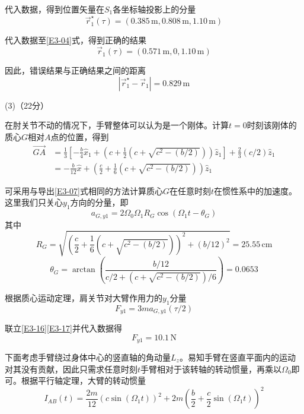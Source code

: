 \documentclass[10pt,a4paper,onecolumn,UTF8]{ctexart}
\begin{document}
	代入数据，得到位置矢量在$S_1$各坐标轴投影上的分量
	\begin{equation}
		\vec r_1^{\star}(\tau)=(0.385\,\text{m},0.808\,\text{m},1.10\,\text{m})
	\end{equation}
	
	代入数据至\eqref{E3-04}式，得到正确的结果
	\begin{equation}
		\vec r_1(\tau)=(0.571\,\text{m},0,1.10\,\text{m})
	\end{equation}
	
	因此，错误结果与正确结果之间的距离
	\begin{equation}
		|\vec r_1^{\star}-\vec r_1|=0.829\,\text{m}
	\end{equation}
	
	(3)（22分）
	
	在肘关节不动的情况下，手臂整体可以认为是一个刚体。计算$t=0$时刻该刚体的质心$G$相对$A$点的位置，得到
	\begin{equation}
		\begin{aligned}
			\overrightarrow{GA}&=\frac{1}{3}\left[-\frac b 4 \hat x_1+\left(c+\frac 1 2\left(c+\sqrt{c^2-\left(b/2\right)}\right)\right)\hat z_1\right]+\frac 2 3 (c/2)\hat z_1\\
			&=-\frac{b}{12}\hat x+\left(\frac c 2+\frac 1 6\left(c+\sqrt{c^2-\left(b/2\right)}\right)\right)\hat z_1
		\end{aligned}
	\end{equation}
	
	可采用与导出\eqref{E3-07}式相同的方法计算质心$G$在任意时刻$t$在惯性系中的加速度。这里我们只关心$y_1$方向的分量，即
	\begin{equation}\label{E3-16}
		a_{G,y1}=2\Omega_0\Omega_1R_G\cos(\Omega_1t-\theta_G)
	\end{equation}
	其中
	$$R_G=\sqrt{\left(\frac c 2+\frac 1 6\left(c+\sqrt{c^2-\left(b/2\right)}\right)\right)^2+(b/12)^2}=25.55\,\text{cm}$$
	$$\theta_G=\arctan\left(\frac{b/12}{c/2+\left(c+\sqrt{c^2-\left(b/2\right)}\right)/6}\right)=0.0653$$
	
	根据质心运动定理，肩关节对大臂作用力的$y_1$分量
	\begin{equation}\label{E3-17}
		F_{y1}=3ma_{G,y1}(\tau/2)
	\end{equation}
	
	联立\eqref{E3-16}\eqref{E3-17}并代入数据得
	\begin{equation}\label{E3-18}
		F_{y1}=10.1\,\text{N}
	\end{equation}
	
	下面考虑手臂绕过身体中心的竖直轴的角动量$L_z$。易知手臂在竖直平面内的运动对其没有贡献，因此只需求任意时刻$t$手臂相对于该转轴的转动惯量，再乘以$\Omega_0$即可。根据平行轴定理，大臂的转动惯量
	\begin{equation}\label{E3-19}
		I_{AB}(t)=\frac{2m}{12}(c\sin(\Omega_1t))^2+2m\left(\frac b 2+\frac c 2\sin(\Omega_1t)\right)^2
	\end{equation}
	
\end{document}
